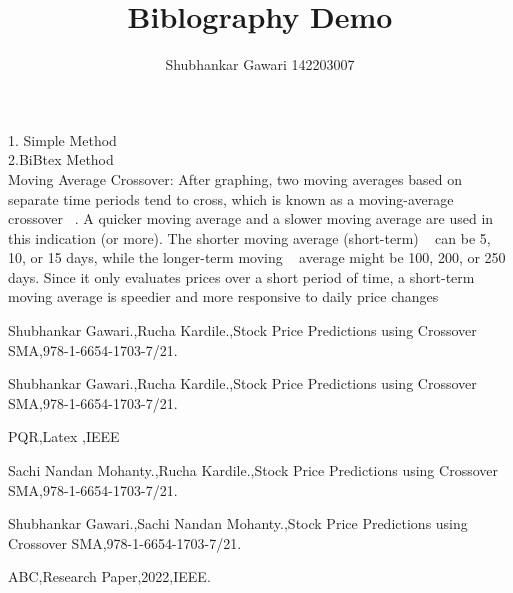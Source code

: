 \documentclass[11pt,a4paper]{report}
\author{Shubhankar Gawari 142203007}
\title{Biblography Demo}
\begin{document}
\maketitle

1. Simple Method\\
2.BiBtex Method\\

Moving Average Crossover: After graphing, two 
moving averages based on separate time periods tend to cross, 
which is known as a moving-average crossover ~\cite{abc}. A quicker 
moving average and a slower moving average are used in this 
indication (or more). The shorter moving average (short-term) ~\cite{pqr}
can be 5, 10, or 15 days, while the longer-term moving ~\cite{aa,trishna}
average might be 100, 200, or 250 days. Since it only 
evaluates prices over a short period of time, a short-term 
moving average is speedier and more responsive to daily 
price changes ~\cite{trishna,sachi,rucha}


\begin{thebibliography} {}

Shubhankar Gawari.,Rucha Kardile.,Stock Price Predictions using Crossover SMA,978-1-6654-1703-7/21.

 Shubhankar Gawari.,Rucha Kardile.,Stock Price Predictions using Crossover SMA,978-1-6654-1703-7/21.

 PQR,Latex ,IEEE

 Sachi Nandan Mohanty.,Rucha Kardile.,Stock Price Predictions using Crossover SMA,978-1-6654-1703-7/21.

 Shubhankar Gawari.,Sachi Nandan Mohanty.,Stock Price Predictions using Crossover SMA,978-1-6654-1703-7/21.

 ABC,Research Paper,2022,IEEE.



\end{thebibliography} 
\end{document}
